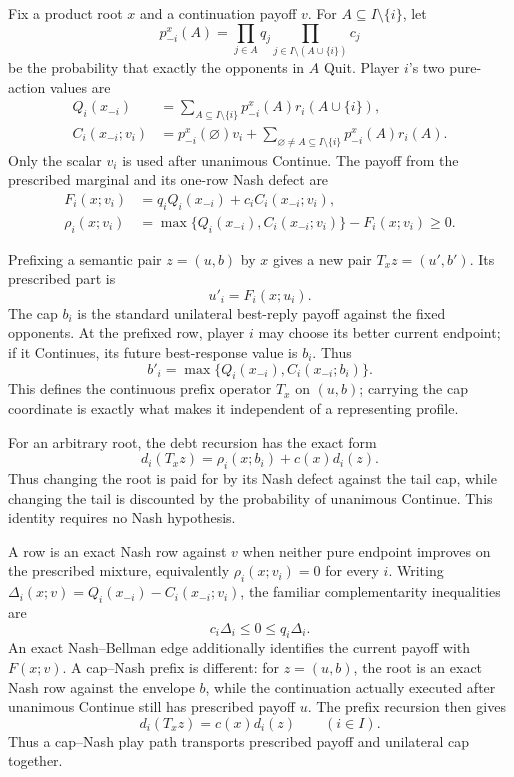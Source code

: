 \documentclass[11pt]{article}
\begin{document}
Fix a product root $x$ and a continuation payoff $v$.  For
$A\subseteq I\setminus\{i\}$, let
\[
 p^x_{-i}(A)=\prod_{j\in A}q_j
              \prod_{j\in I\setminus(A\cup\{i\})}c_j
\]
be the probability that exactly the opponents in $A$ Quit.  Player $i$'s
two pure-action values are
\[
 \begin{aligned}
 Q_i(x_{-i})
   &=\sum_{A\subseteq I\setminus\{i\}}p^x_{-i}(A)
        r_i(A\cup\{i\}),\\
 C_i(x_{-i};v_i)
   &=p^x_{-i}(\varnothing)v_i
     +\sum_{\varnothing\ne A\subseteq I\setminus\{i\}}
        p^x_{-i}(A)r_i(A).
 \end{aligned}
\]
Only the scalar $v_i$ is used after unanimous Continue.  The payoff from
the prescribed marginal and its one-row Nash defect are
\[
 \begin{aligned}
 F_i(x;v_i)&=q_iQ_i(x_{-i})+c_iC_i(x_{-i};v_i),\\
 \rho_i(x;v_i)&=\max\{Q_i(x_{-i}),C_i(x_{-i};v_i)\}-F_i(x;v_i)\ge0.
 \end{aligned}
\]

Prefixing a semantic pair $z=(u,b)$ by $x$ gives a new pair $T_xz=(u',b')$.
Its prescribed part is
\[
 u'_i=F_i(x;u_i).
\]
The cap $b_i$ is the standard unilateral best-reply payoff against the fixed
opponents.  At the prefixed row, player $i$ may choose its better current
endpoint; if it
Continues, its future best-response value is $b_i$.  Thus
\[
 b'_i=\max\bigl\{Q_i(x_{-i}),C_i(x_{-i};b_i)\bigr\}.
\]
This defines the continuous prefix operator $T_x$ on $(u,b)$; carrying the
cap coordinate is exactly what makes it independent of a representing
profile.

For an arbitrary root, the debt recursion has the exact form
\begin{equation}
\label{eq:debt-recursion}
 d_i(T_xz)=\rho_i(x;b_i)+c(x)d_i(z).
\end{equation}
Thus changing the root is paid for by its Nash defect against the tail cap,
while changing the tail is discounted by the probability of unanimous
Continue.  This identity requires no Nash hypothesis.

A row is an exact Nash row against $v$ when neither pure endpoint improves
on the prescribed mixture, equivalently $\rho_i(x;v_i)=0$ for every $i$.
Writing
$\Delta_i(x;v)=Q_i(x_{-i})-C_i(x_{-i};v_i)$, the familiar
complementarity inequalities are
\[
 c_i\Delta_i\le0\le q_i\Delta_i.
\]
An exact Nash--Bellman edge additionally identifies the current payoff with
$F(x;v)$.  A cap--Nash prefix is different: for $z=(u,b)$, the root is an
exact Nash row against the envelope $b$, while the continuation actually
executed after unanimous Continue still has prescribed payoff $u$.  The
prefix recursion then gives
\begin{equation}
\label{eq:cap-nash-scaling}
 d_i(T_xz)=c(x)d_i(z)\qquad(i\in I).
\end{equation}
Thus a cap--Nash play path transports prescribed payoff and unilateral cap
together.
\end{document}
